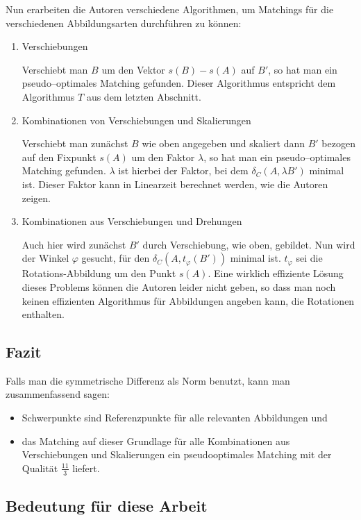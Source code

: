 Nun erarbeiten die Autoren verschiedene Algorithmen, um Matchings für die verschiedenen Abbildungsarten durchführen zu können:
\begin{enumerate}
\item Verschiebungen

Verschiebt man $B$ um den Vektor $s(B)-s(A)$ auf $B'$, so hat man ein pseudo--optimales Matching gefunden. Dieser Algorithmus entspricht dem Algorithmus $T$ aus dem letzten Abschnitt.

\item Kombinationen von Verschiebungen und Skalierungen

Verschiebt man zunächst $B$ wie oben angegeben und skaliert dann $B'$ bezogen auf den Fixpunkt $s(A)$ um den Faktor $\lambda$, so hat man ein pseudo--optimales Matching gefunden. $\lambda$ ist hierbei der Faktor, bei dem $\delta_C(A,\lambda B')$ minimal ist. Dieser Faktor kann in Linearzeit berechnet werden, wie die Autoren zeigen.

\item Kombinationen aus Verschiebungen und Drehungen

Auch hier wird zunächst $B'$ durch Verschiebung, wie oben, gebildet. Nun wird der Winkel $\varphi$ gesucht, für den $\delta_C(A,t_\varphi( B'))$ minimal ist. $t_\varphi$ sei die Rotations-Abbildung um den Punkt $s(A)$. Eine wirklich effiziente Lösung dieses Problems können die Autoren leider nicht geben, so dass man noch keinen effizienten Algorithmus für Abbildungen angeben kann, die Rotationen enthalten. 
\end{enumerate}

\subsection{Fazit}

Falls man die symmetrische Differenz als Norm benutzt, kann man  zusammenfassend sagen:
\begin{itemize}
\item Schwerpunkte sind Referenzpunkte für alle relevanten Abbildungen und
\item das Matching auf dieser Grundlage für alle Kombinationen aus Verschiebungen und Skalierungen ein pseudooptimales Matching mit der Qualität $\frac{11}{3}$ liefert. 
\end{itemize} 
\subsection{Bedeutung für diese Arbeit}\label{BedeutungAFRW}

